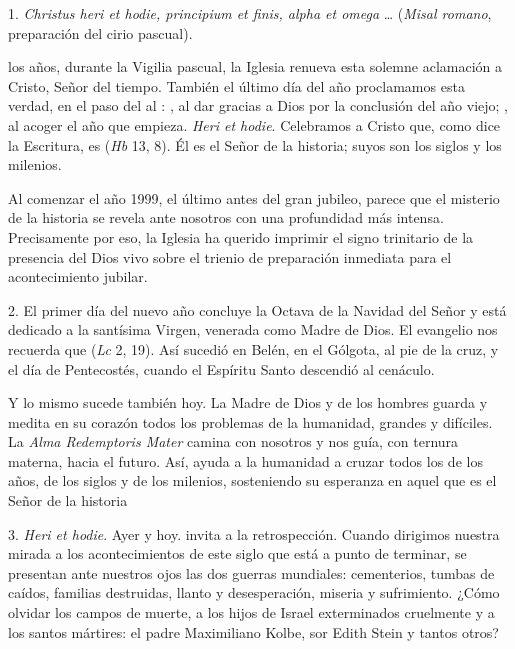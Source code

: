 \begin{body}
	1. \emph{Christus heri et hodie, principium et finis, alpha et omega} \ldots{}  (\emph{Misal romano}, preparación del cirio pascual).
	
	 los años, durante la Vigilia pascual, la Iglesia renueva esta solemne aclamación a Cristo, Señor del tiempo. También el último día del año proclamamos esta verdad, en el paso del  al : , al dar gracias a Dios por la conclusión del año viejo; , al acoger el año que empieza. \emph{Heri et hodie}. Celebramos a Cristo que, como dice la Escritura, es  (\emph{Hb} 13, 8). Él es el Señor de la historia; suyos son los siglos y los milenios.
	
	Al comenzar el año 1999, el último antes del gran jubileo, parece que el misterio de la historia se revela ante nosotros con una profundidad más intensa. Precisamente por eso, la Iglesia ha querido imprimir el signo trinitario de la presencia del Dios vivo sobre el trienio de preparación inmediata para el acontecimiento jubilar.
	
	2. El primer día del nuevo año concluye la Octava de la Navidad del Señor y está dedicado a la santísima Virgen, venerada como Madre de Dios. El evangelio nos recuerda que  (\emph{Lc} 2, 19). Así sucedió en Belén, en el Gólgota, al pie de la cruz, y el día de Pentecostés, cuando el Espíritu Santo descendió al cenáculo.
	
	Y lo mismo sucede también hoy. La Madre de Dios y de los hombres guarda y medita en su corazón todos los problemas de la humanidad, grandes y difíciles. La \emph{Alma Redemptoris Mater} camina con nosotros y nos guía, con ternura materna, hacia el futuro. Así, ayuda a la humanidad a cruzar todos los  de los años, de los siglos y de los milenios, sosteniendo su esperanza en aquel que es el Señor de la historia
	
	3. \emph{Heri et hodie}. Ayer y hoy.  invita a la retrospección. Cuando dirigimos nuestra mirada a los acontecimientos de este siglo que está a punto de terminar, se presentan ante nuestros ojos las dos guerras mundiales: cementerios, tumbas de caídos, familias destruidas, llanto y desesperación, miseria y sufrimiento. ¿Cómo olvidar los campos de muerte, a los hijos de Israel exterminados cruelmente y a los santos mártires: el padre Maximiliano Kolbe, sor Edith Stein y tantos otros?
	

\end{body}
